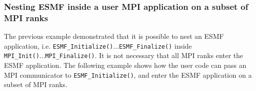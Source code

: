  
\setlength{\oldparskip}{\parskip}
\setlength{\parskip}{1.5ex}
\setlength{\oldparindent}{\parindent}
\setlength{\parindent}{0pt}
\setlength{\oldbaselineskip}{\baselineskip}
\setlength{\baselineskip}{11pt}
 
\def\bv{\begin{verbatim}}
\def\ev{\end{verbatim}}
\def\be{\begin{equation}}
\def\ee{\end{equation}}
\def\bea{\begin{eqnarray}}
\def\eea{\end{eqnarray}}
\def\bi{\begin{itemize}}
\def\ei{\end{itemize}}
\def\bn{\begin{enumerate}}
\def\en{\end{enumerate}}
\def\bd{\begin{description}}
\def\ed{\end{description}}
\def\({\left (}
\def\){\right )}
\def\[{\left [}
\def\]{\right ]}
\def\<{\left  \langle}
\def\>{\right \rangle}
\def\cI{{\cal I}}
\def\diag{\mathop{\rm diag}}
\def\tr{\mathop{\rm tr}}


 

  
   \subsubsection{Nesting ESMF inside a user MPI application on a subset of MPI ranks}
   \label{vm_nesting_esmf}
  
   \begin{sloppypar}
   The previous example demonstrated that it is possible to nest an ESMF 
   application, i.e. {\tt ESMF\_Initialize()}...{\tt ESMF\_Finalize()} inside
   {\tt MPI\_Init()}...{\tt MPI\_Finalize()}. It is not necessary that all
   MPI ranks enter the ESMF application. The following example shows how the
   user code can pass an MPI communicator to {\tt ESMF\_Initialize()}, and
   enter the ESMF application on a subset of MPI ranks.
   \end{sloppypar}
   
